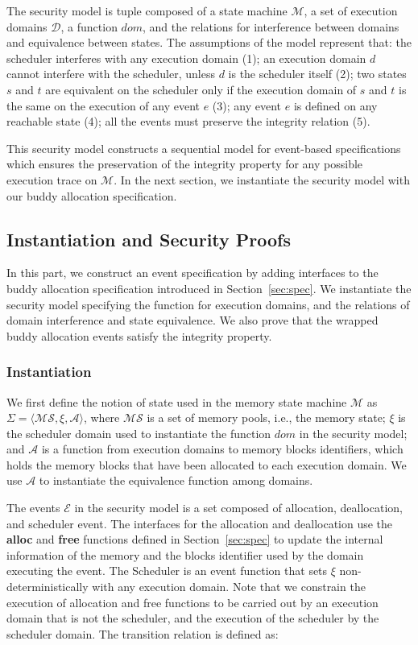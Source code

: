 The security model is tuple composed of a state machine $\mathcal{M}$, a set of execution domains $\mathcal{D}$, a function $dom$, and the relations for interference between domains and equivalence between states. The assumptions of the model represent that: the scheduler interferes with any execution domain (1); an execution domain $d$ cannot interfere with the scheduler, unless $d$ is the scheduler itself (2); two states $s$ and $t$ are equivalent on the scheduler only if the execution domain of $s$ and $t$ is the same on the execution of any event $e$ (3); any event $e$ is defined on any reachable state (4); all the events must preserve the integrity relation (5).

This security model constructs a sequential model for event-based specifications which ensures the preservation of the integrity property for any possible execution trace on $\mathcal{M}$. In the next section, we instantiate the security model with our buddy allocation specification.

\subsection{Instantiation and Security Proofs}\label{sec:securityproof}
In this part, we construct an event specification by adding interfaces to the buddy allocation specification introduced in Section~\ref{sec:spec}. We instantiate the security model specifying the function for execution domains, and the relations of domain interference and state equivalence. We also prove that the wrapped buddy allocation events satisfy the integrity property.

\subsubsection{Instantiation}
We first define the notion of state used in the memory state machine $\mathcal{M}$ as $\Sigma = \langle \mathcal{MS}, \xi, \mathcal{A} \rangle$, where $\mathcal{MS}$ is a set of memory pools, i.e., the memory state; $\xi$ is the scheduler domain used to instantiate the function $dom$ in the security model; and $\mathcal{A}$ is a function from execution domains to memory blocks identifiers, which holds the memory blocks that have been allocated to each execution domain. We use $\mathcal{A}$ to instantiate the equivalence function among domains.

The events $\mathcal{E}$ in the security model is a set composed of allocation, deallocation, and scheduler event. The interfaces for the allocation and deallocation use the \textbf{alloc} and \textbf{free} functions defined in Section~\ref{sec:spec} to update the internal information of the memory and the blocks identifier used by the domain executing the event. The Scheduler is an event function that sets $\xi$ non-deterministically with any execution domain. Note that we constrain the execution of allocation and free functions to be carried out by an execution domain that is not the scheduler, and the execution of the scheduler by the scheduler domain. The transition relation is defined as:

